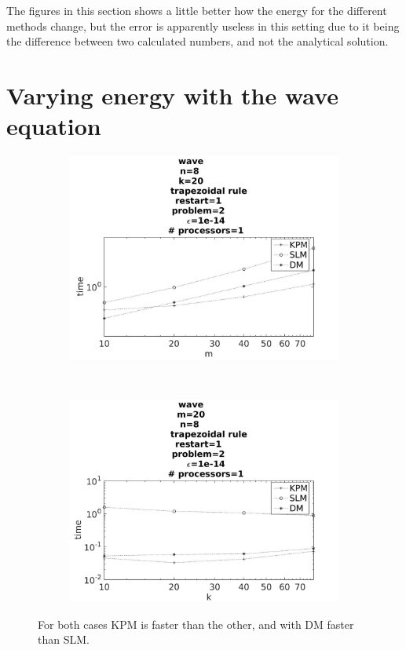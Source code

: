 The figures in this section shows a little better how the energy for the different methods change, but the error is apparently useless in this setting due to it being the difference between two calculated numbers, and not the analytical solution. 

\section{Varying energy with the wave equation}
\begin{figure}[H]
        \centering
        \begin{subfigure}[b]{0.45\textwidth}
                \includegraphics[width=\textwidth]{../MATLAB/fig/vresulttimem.jpg}
                \caption{  }
                \label{fig:vresulttimem}
        \end{subfigure}
        ~
        \begin{subfigure}[b]{0.45\textwidth}
                \includegraphics[width=\textwidth]{../MATLAB/fig/vresulttimek.jpg}
                \caption{  }
                \label{fig:vresulttimek}
        \end{subfigure}
        \caption{ For both cases KPM is faster than the other, and with DM faster than SLM.  }
        \label{fig:vresulttime}
\end{figure}
